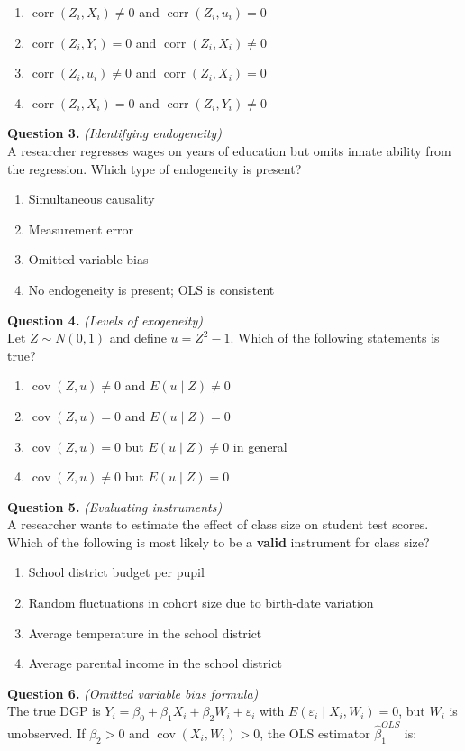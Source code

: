 \documentclass[11pt]{article}
\newcommand{\choices}[4]{%
  \begin{enumerate}[label=(\alph*), leftmargin=2em, itemsep=2pt]
    \item #1
    \item #2
    \item #3
    \item #4
  \end{enumerate}
}
\begin{document}
\choices
{$\operatorname{corr}(Z_i, X_i) \neq 0$ and $\operatorname{corr}(Z_i, u_i) = 0$}
{$\operatorname{corr}(Z_i, Y_i) = 0$ and $\operatorname{corr}(Z_i, X_i) \neq 0$}
{$\operatorname{corr}(Z_i, u_i) \neq 0$ and $\operatorname{corr}(Z_i, X_i) = 0$}
{$\operatorname{corr}(Z_i, X_i) = 0$ and $\operatorname{corr}(Z_i, Y_i) \neq 0$}

\bigskip


\noindent\textbf{Question 3.} \textit{(Identifying endogeneity)} \\[0.3em]
A researcher regresses wages on years of education but omits innate ability from the regression. Which type of endogeneity is present?

\choices
{Simultaneous causality}
{Measurement error}
{Omitted variable bias}
{No endogeneity is present; OLS is consistent}

\bigskip


\noindent\textbf{Question 4.} \textit{(Levels of exogeneity)} \\[0.3em]
Let $Z \sim N(0,1)$ and define $u = Z^2 - 1$. Which of the following statements is true?

\choices
{$\operatorname{cov}(Z, u) \neq 0$ and $E(u \mid Z) \neq 0$}
{$\operatorname{cov}(Z, u) = 0$ and $E(u \mid Z) = 0$}
{$\operatorname{cov}(Z, u) = 0$ but $E(u \mid Z) \neq 0$ in general}
{$\operatorname{cov}(Z, u) \neq 0$ but $E(u \mid Z) = 0$}

\bigskip


\noindent\textbf{Question 5.} \textit{(Evaluating instruments)} \\[0.3em]
A researcher wants to estimate the effect of class size on student test scores. Which of the following is most likely to be a \textbf{valid} instrument for class size?

\choices
{School district budget per pupil}
{Random fluctuations in cohort size due to birth-date variation}
{Average temperature in the school district}
{Average parental income in the school district}

\bigskip


\noindent\textbf{Question 6.} \textit{(Omitted variable bias formula)} \\[0.3em]
The true DGP is $Y_i = \beta_0 + \beta_1 X_i + \beta_2 W_i + \varepsilon_i$ with $E(\varepsilon_i \mid X_i, W_i) = 0$, but $W_i$ is unobserved. If $\beta_2 > 0$ and $\operatorname{cov}(X_i, W_i) > 0$, the OLS estimator $\widehat{\beta}_1^{OLS}$ is:
\end{document}
